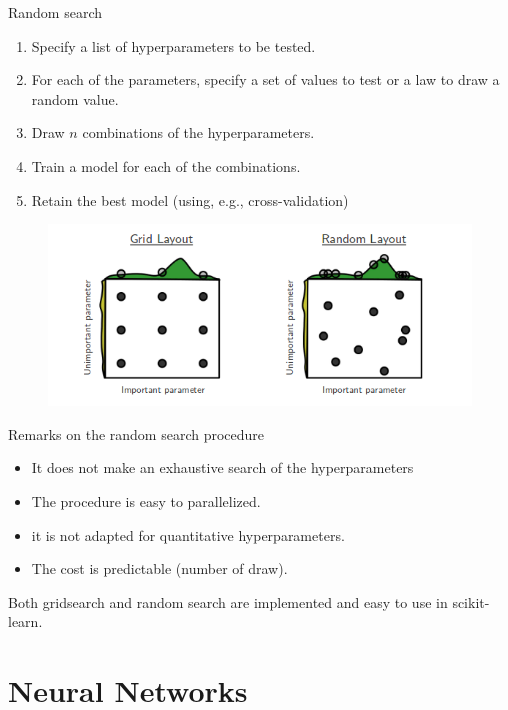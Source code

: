 \documentclass[handout]{beamer}
\begin{document}
\begin{frame}{Random search}
    \begin{enumerate}
    \item Specify a list of hyperparameters to be tested.
    \item For each of the parameters, specify a set of values to test or a law to draw a random value.
    \item Draw $n$ combinations of the hyperparameters.
    \item Train a model for each of the combinations.
    \item Retain the best model (using, e.g., cross-validation)
\end{enumerate}
\begin{figure}
    \centering
    \includegraphics[width=.9\textwidth]{fig/L2/cIDuR.png}
\end{figure}
\end{frame}

\begin{frame}{Remarks on the random search procedure}

\begin{itemize}
    \item It \alert{does not make} an \alert{exhaustive} search of the hyperparameters
    \item The procedure is easy to \alert{parallelized}.
    \item it is not adapted for quantitative hyperparameters.
    \item The cost is predictable (number of draw).
\end{itemize}
\pause
Both gridsearch and random search are implemented and easy to use in scikit-learn.
\end{frame}


\section{Neural Networks}
\end{document}
